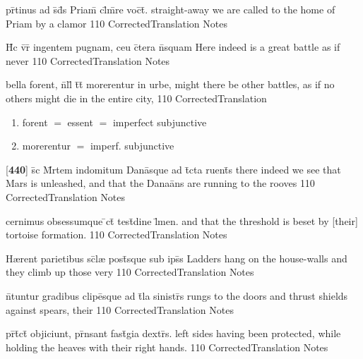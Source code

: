 \latline
  {pr\={}tinus ad s\={}d\={}s Priam\={\macron {\i}} cl\={}m\={}re voc\={}t\={\macron {\i}}.}
  { straight-away we are called to the home of Priam by a clamor }
  {110}
  { CorrectedTranslation }
  { Notes }


\latline
  {H\={\macron {\i}}c v\={}r\={} ingentem pugnam, ceu c\={}tera n\={}squam}
  { Here indeed is a great battle as if never  }
  {110}
  { CorrectedTranslation }
  { Notes }


\latline
  {bella forent, n\={}ll\={\macron {\i}} t\={}t\={} morerentur in urbe,}
  { might there be other battles, as if no others might die in the entire city,  }
  {110}
  { CorrectedTranslation }
  { \begin{enumerate}
  	\item forent $=$ essent $=$ imperfect subjunctive
  	\item morerentur $=$ imperf. subjunctive
  \end{enumerate} }


\latline
  {[\textbf{440}] s\={\macron {\i}}c M\={}rtem indomitum Dana\={}sque ad t\={}cta ruent\={\macron {\i}}s}
  { there indeed we see that Mars is unleashed, and that the Dana{\=a}ns are running to the rooves }
  {110}
  { CorrectedTranslation }
  { Notes }


\latline
  {cernimus obsessumque \={}ct\={} test\={}dine l\={\macron {\i}}men.}
  { and that the threshold is beset by [their] tortoise formation. }
  {110}
  { CorrectedTranslation }
  { Notes }


\latline
  {H{\ae}rent parietibus sc\={}l{\ae} post\={\macron {\i}}sque sub ips\={}s}
  { Ladders hang on the house-walls and they climb up those very }
  {110}
  { CorrectedTranslation }
  { Notes }


\latline
  {n\={\macron {\i}}tuntur gradibus clipe\={}sque ad t\={}la sinistr\={\macron {\i}}s}
  { rungs to the doors and thrust shields against spears, their  }
  {110}
  { CorrectedTranslation }
  { Notes }


\latline
  {pr\={}t\={}ct\={\macron {\i}} objiciunt, pr\={}nsant fast\={\macron {\i}}gia dextr\={\macron {\i}}s.}
  { left sides having been protected, while holding the heaves with their right hands. }
  {110}
  { CorrectedTranslation }
  { Notes }


